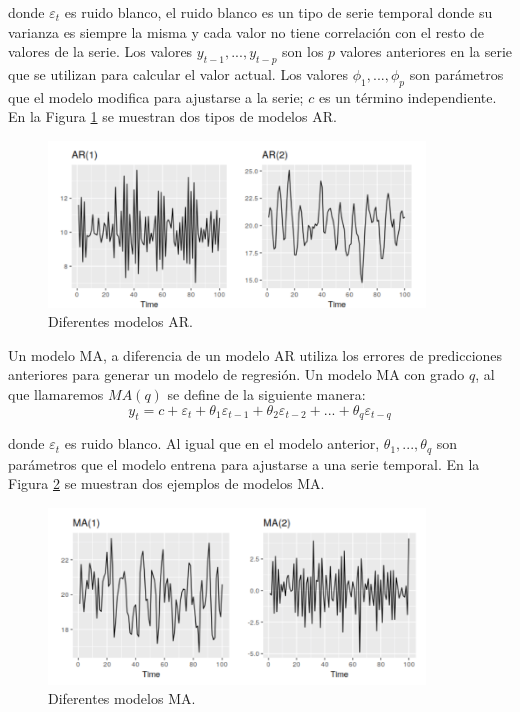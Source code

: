 \noindent donde $\varepsilon_t$ es ruido blanco, el ruido blanco es un tipo de serie temporal donde su varianza es siempre la misma y cada valor no tiene correlación con el resto de valores de la serie. Los valores $y_{t-1}, ..., y_{t-p}$ son los $p$ valores anteriores en la serie que se utilizan para calcular el valor actual. Los valores $\phi_1, ..., \phi_p$ son parámetros que el modelo modifica para ajustarse a la serie; $c$ es un término independiente. En la Figura \ref{fig:211} se muestran dos tipos de modelos AR.\newline

\begin{figure}[H]
	\centering
	\includegraphics[width=100mm]{imagenes/autoregression_example.png}
	\caption{Diferentes modelos AR.}
	\label{fig:211}
\end{figure}
\verticalspace

Un modelo MA, a diferencia de un modelo AR utiliza los errores de predicciones anteriores para generar un modelo de regresión. Un modelo MA con grado $q$, al que llamaremos $MA(q)$ se define de la siguiente manera:
$$ y_t = c + \varepsilon_t + \theta_1 \varepsilon_{t-1} + \theta_2 \varepsilon_{t-2} + ... + \theta_q \varepsilon_{t-q}$$

\noindent donde $\varepsilon_t$ es ruido blanco. Al igual que en el modelo anterior, $\theta_1, ..., \theta_q$ son parámetros que el modelo entrena para ajustarse a una serie temporal. En la Figura \ref{fig:212} se muestran dos ejemplos de modelos MA.

\newpage

\begin{figure}[H]
	\centering
	\includegraphics[width=100mm]{imagenes/moving_averages_example.png}
	\caption{Diferentes modelos MA.}
	\label{fig:212}
\end{figure}

